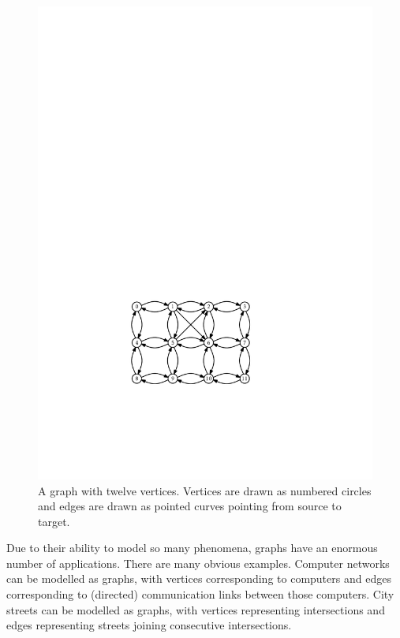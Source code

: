 \begin{figure}
	\begin{center}
		\includegraphics[scale=0.90909]{figs/graph}
	\end{center}
	\caption{A graph with twelve vertices.  Vertices are drawn as numbered
		circles and edges are drawn as pointed curves pointing from source
		to target.}
\end{figure}

Due to their ability to model so many phenomena, graphs have an enormous
number of applications. There are many obvious examples. Computer
networks can be modelled as graphs, with vertices corresponding to
computers and edges corresponding to (directed) communication links
between those computers.  City streets can be modelled as graphs,
with vertices representing intersections and edges representing streets
joining consecutive intersections.

